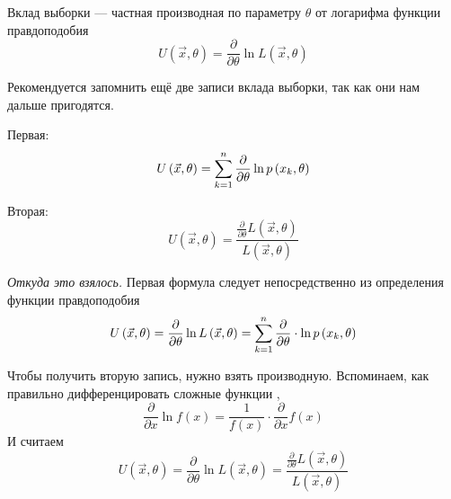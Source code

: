 \begin{definition}\label{def:defU}
  Вклад выборки --- частная производная по параметру $\theta$
  от логарифма функции правдоподобия
  $$U\left( \vec{x},\theta \right)
      = \frac{\partial}{\partial\theta}\ln{L\left(\vec{x},\theta\right)}$$
\end{definition}

\begin{remark}\label{remark:defU}
  Рекомендуется запомнить ещё две записи вклада выборки, так как они нам
  дальше пригодятся.

  Первая:
  \begin{align*}
    U\left( \vec{x},\theta \right)
    = \sum_{k=1}^n\frac{\partial}{\partial\theta}\ln{p\left(x_k,\theta\right)}
  \end{align*}

  Вторая:
  $$U\left( \vec{x},\theta \right)
    = \frac{\frac{\partial}{\partial\theta}L\left(\vec{x},\theta\right)}
      {L\left(\vec{x},\theta\right)}$$
\end{remark}
\textit{Откуда это взялось.}
Первая формула следует непосредственно из определения функции правдоподобия
$$U\left( \vec{x},\theta \right)
    = \frac{\partial}{\partial\theta}\ln{L\left(\vec{x},\theta\right)}
    = \sum_{k=1}^n
      \frac{\partial}{\partial\theta}\cdot \ln{p\left(x_k,\theta\right)}$$

Чтобы получить вторую запись, нужно взять производную.
Вспоминаем, как правильно дифференцировать сложные функции
\cite[с.~226]{Fichtenholz1}, \cite[с.~133]{DorogovtsevMA}
$$\frac{\partial}{\partial x} \ln{f\left( x \right)}
  = \frac{1}{f\left( x \right)}
    \cdot \frac{\partial}{\partial x} f\left( x \right)$$
И считаем
$$U\left( \vec{x},\theta \right)
  = \frac{\partial}{\partial\theta}\ln{L\left(\vec{x},\theta\right)}
  = \frac{\frac{\partial}{\partial\theta}L\left(\vec{x},\theta\right)}
    {L\left(\vec{x},\theta\right)}$$

